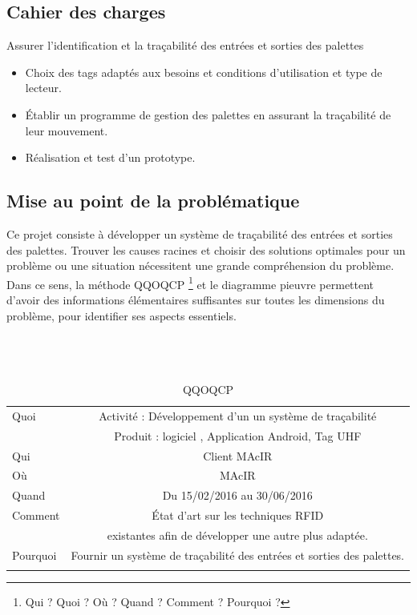 \documentclass[11pt, a4paper, twoside]{book}
\begin{document}
\subsection{Cahier des charges}
Assurer l’identification et la traçabilité des entrées et sorties des palettes
\begin{itemize}
\item Choix des tags adaptés aux besoins et conditions d’utilisation et type de lecteur.
\item Établir un programme de gestion des palettes en assurant la traçabilité de leur mouvement.
\item Réalisation et test d’un prototype.\\
\end{itemize}
\subsection{Mise au point de la problématique}
Ce projet consiste à développer un système de traçabilité des entrées et sorties des palettes. Trouver les causes racines et choisir des solutions optimales pour un problème ou une situation nécessitent une grande compréhension du problème. Dans ce sens, la méthode QQOQCP \footnote{Qui ? Quoi ? Où ? Quand ? Comment ?  Pourquoi ?} et le diagramme pieuvre permettent d'avoir des informations élémentaires suffisantes sur toutes les dimensions du problème, pour identifier ses aspects essentiels.\\\\\\\
        
\begin{longtable}{|l|c|}
  \hline
  Quoi & Activité : Développement d’un un système de traçabilité \\
       &  Produit : logiciel , Application Android, Tag UHF \\
  \hline
  Qui & Client MAcIR\\
  \hline
  Où & MAcIR\\
  \hline
  Quand & Du 15/02/2016 au 30/06/2016\\
  \hline
  Comment & État d’art sur les techniques RFID \\
          &  existantes afin de développer une autre plus adaptée.\\
  \hline
  Pourquoi & Fournir un système de traçabilité des entrées et sorties des palettes.\\
  \hline
  
\caption{QQOQCP}
\end{longtable}
\end{document}
